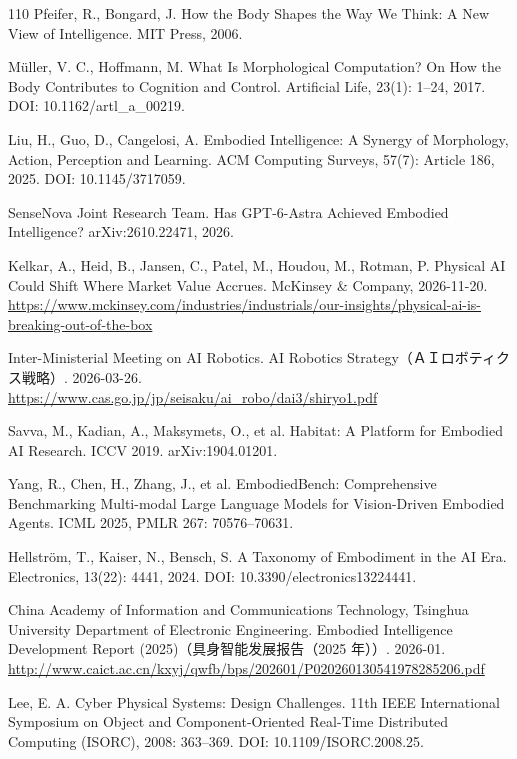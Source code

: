 \documentclass[10pt]{article}
\begin{document}
\begin{thebibliography}{110}
Pfeifer, R., Bongard, J. How the Body Shapes the Way We Think: A New View of Intelligence. MIT Press, 2006.

Müller, V. C., Hoffmann, M. What Is Morphological Computation? On How the Body Contributes to Cognition and Control. Artificial Life, 23(1): 1–24, 2017. DOI: 10.1162/artl\_a\_00219.

Liu, H., Guo, D., Cangelosi, A. Embodied Intelligence: A Synergy of Morphology, Action, Perception and Learning. ACM Computing Surveys, 57(7): Article 186, 2025. DOI: 10.1145/3717059.

SenseNova Joint Research Team. Has GPT-6-Astra Achieved Embodied Intelligence? arXiv:2610.22471, 2026.

Kelkar, A., Heid, B., Jansen, C., Patel, M., Houdou, M., Rotman, P. Physical AI Could Shift Where Market Value Accrues. McKinsey \& Company, 2026-11-20. \url{https://www.mckinsey.com/industries/industrials/our-insights/physical-ai-is-breaking-out-of-the-box}

Inter-Ministerial Meeting on AI Robotics. AI Robotics Strategy（{\jafont ＡＩロボティクス戦略}）. 2026-03-26. \url{https://www.cas.go.jp/jp/seisaku/ai_robo/dai3/shiryo1.pdf}

Savva, M., Kadian, A., Maksymets, O., et al. Habitat: A Platform for Embodied AI Research. ICCV 2019. arXiv:1904.01201.

Yang, R., Chen, H., Zhang, J., et al. EmbodiedBench: Comprehensive Benchmarking Multi-modal Large Language Models for Vision-Driven Embodied Agents. ICML 2025, PMLR 267: 70576–70631.

Hellström, T., Kaiser, N., Bensch, S. A Taxonomy of Embodiment in the AI Era. Electronics, 13(22): 4441, 2024. DOI: 10.3390/electronics13224441.

China Academy of Information and Communications Technology, Tsinghua University Department of Electronic Engineering. Embodied Intelligence Development Report (2025)（具身智能发展报告（2025 年））. 2026-01. \url{http://www.caict.ac.cn/kxyj/qwfb/bps/202601/P020260130541978285206.pdf}

Lee, E. A. Cyber Physical Systems: Design Challenges. 11th IEEE International Symposium on Object and Component-Oriented Real-Time Distributed Computing (ISORC), 2008: 363–369. DOI: 10.1109/ISORC.2008.25.


\end{thebibliography}
\end{document}
